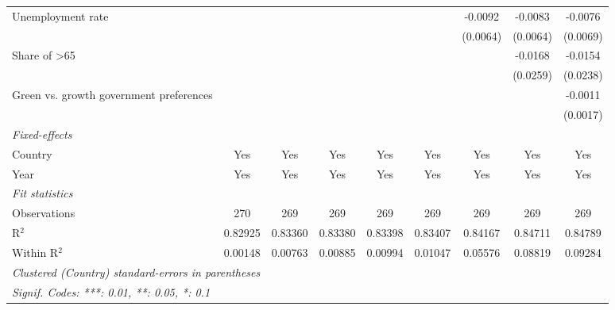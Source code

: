 \begin{table}[htbp]
\begin{tabular}{lcccccccc}
      Unemployment rate                                                 &          &          &          &          &          & -0.0092  & -0.0083  & -0.0076\\   
                                                                        &          &          &          &          &          & (0.0064) & (0.0064) & (0.0069)\\   
      Share of >65                                                      &          &          &          &          &          &          & -0.0168  & -0.0154\\   
                                                                        &          &          &          &          &          &          & (0.0259) & (0.0238)\\   
      Green vs. growth government preferences                           &          &          &          &          &          &          &          & -0.0011\\   
                                                                        &          &          &          &          &          &          &          & (0.0017)\\   
      \midrule
      \emph{Fixed-effects}\\
      Country                                                           & Yes      & Yes      & Yes      & Yes      & Yes      & Yes      & Yes      & Yes\\  
      Year                                                              & Yes      & Yes      & Yes      & Yes      & Yes      & Yes      & Yes      & Yes\\  
      \midrule
      \emph{Fit statistics}\\
      Observations                                                      & 270      & 269      & 269      & 269      & 269      & 269      & 269      & 269\\  
      R$^2$                                                             & 0.82925  & 0.83360  & 0.83380  & 0.83398  & 0.83407  & 0.84167  & 0.84711  & 0.84789\\  
      Within R$^2$                                                      & 0.00148  & 0.00763  & 0.00885  & 0.00994  & 0.01047  & 0.05576  & 0.08819  & 0.09284\\  
      \midrule \midrule
      \multicolumn{9}{l}{\emph{Clustered (Country) standard-errors in parentheses}}\\
      \multicolumn{9}{l}{\emph{Signif. Codes: ***: 0.01, **: 0.05, *: 0.1}}\\
   \end{tabular}
\end{table}


